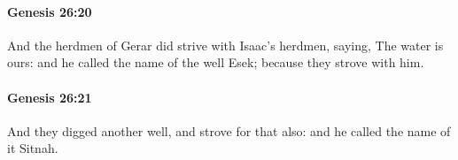 		\paragraph{Genesis 26:20} %
			\label{GENESIS-26-20}

			And the herdmen of Gerar did strive with Isaac's herdmen, saying, The water is ours: and he called the name of the well Esek; because they strove with him.


		\paragraph{Genesis 26:21} %
			\label{GENESIS-26-21}

			And they digged another well, and strove for that also: and he called the name of it Sitnah.


